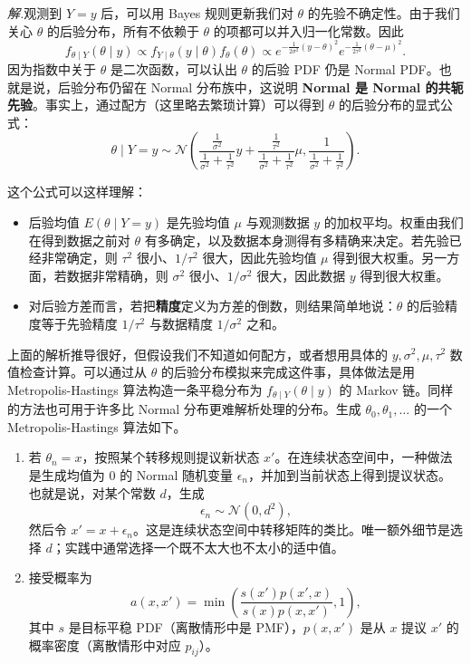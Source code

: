 \documentclass[UTF8,12pt,a4paper,fontset=fandol]{ctexart}
\begin{document}
\noindent\textit{解.}\quad 观测到 $Y=y$ 后，可以用 Bayes 规则更新我们对 $\theta$ 的先验不确定性。由于我们关心 $\theta$ 的后验分布，所有不依赖于 $\theta$ 的项都可以并入归一化常数。因此
\[
  f_{\theta\mid Y}(\theta\mid y)
  \propto
  f_{Y\mid\theta}(y\mid\theta)f_\theta(\theta)
  \propto
  e^{-\frac{1}{2\sigma^2}(y-\theta)^2}
  e^{-\frac{1}{2\tau^2}(\theta-\mu)^2}.
\]
因为指数中关于 $\theta$ 是二次函数，可以认出 $\theta$ 的后验 PDF 仍是 Normal PDF。也就是说，后验分布仍留在 Normal 分布族中，这说明 \textbf{Normal 是 Normal 的共轭先验}。事实上，通过配方（这里略去繁琐计算）可以得到 $\theta$ 的后验分布的显式公式：
\[
  \theta\mid Y=y
  \sim
  \mathcal N\left(
    \frac{\frac{1}{\sigma^2}}{\frac{1}{\sigma^2}+\frac{1}{\tau^2}}y
    +
    \frac{\frac{1}{\tau^2}}{\frac{1}{\sigma^2}+\frac{1}{\tau^2}}\mu,
    \frac{1}{\frac{1}{\sigma^2}+\frac{1}{\tau^2}}
  \right).
\]

这个公式可以这样理解：
\begin{itemize}
  \item 后验均值 $E(\theta\mid Y=y)$ 是先验均值 $\mu$ 与观测数据 $y$ 的加权平均。权重由我们在得到数据之前对 $\theta$ 有多确定，以及数据本身测得有多精确来决定。若先验已经非常确定，则 $\tau^2$ 很小、$1/\tau^2$ 很大，因此先验均值 $\mu$ 得到很大权重。另一方面，若数据非常精确，则 $\sigma^2$ 很小、$1/\sigma^2$ 很大，因此数据 $y$ 得到很大权重。
  \item 对后验方差而言，若把\textbf{精度}定义为方差的倒数，则结果简单地说：$\theta$ 的后验精度等于先验精度 $1/\tau^2$ 与数据精度 $1/\sigma^2$ 之和。
\end{itemize}

上面的解析推导很好，但假设我们不知道如何配方，或者想用具体的 $y,\sigma^2,\mu,\tau^2$ 数值检查计算。可以通过从 $\theta$ 的后验分布模拟来完成这件事，具体做法是用 Metropolis-Hastings 算法构造一条平稳分布为 $f_{\theta\mid Y}(\theta\mid y)$ 的 Markov 链。同样的方法也可用于许多比 Normal 分布更难解析处理的分布。生成 $\theta_0,\theta_1,\ldots$ 的一个 Metropolis-Hastings 算法如下。

\begin{enumerate}
  \item 若 $\theta_n=x$，按照某个转移规则提议新状态 $x'$。在连续状态空间中，一种做法是生成均值为 $0$ 的 Normal 随机变量 $\epsilon_n$，并加到当前状态上得到提议状态。也就是说，对某个常数 $d$，生成
  \[
    \epsilon_n\sim\mathcal N(0,d^2),
  \]
  然后令 $x'=x+\epsilon_n$。这是连续状态空间中转移矩阵的类比。唯一额外细节是选择 $d$；实践中通常选择一个既不太大也不太小的适中值。

  \item 接受概率为
  \[
    a(x,x')=\min\left(
      \frac{s(x')p(x',x)}{s(x)p(x,x')},
      1
    \right),
  \]
  其中 $s$ 是目标平稳 PDF（离散情形中是 PMF），$p(x,x')$ 是从 $x$ 提议 $x'$ 的概率密度（离散情形中对应 $p_{ij}$）。
\end{enumerate}
\end{document}
